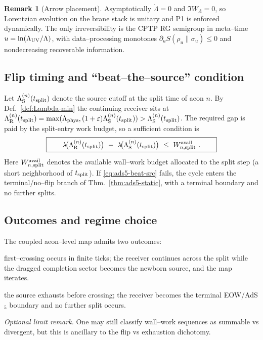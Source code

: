 \documentclass[10pt]{article}
\theoremstyle{definition}
\newtheorem{remark}{Remark}[section]
\theoremstyle{plain}
\begin{document}
\begin{remark}[Arrow placement]
\label{rem:ads5-arrow}
Asymptotically $\dot\Lambda=0$ and $\Im W_\Lambda=0$, so Lorentzian evolution on the brane stack is unitary and P1 is enforced dynamically. The only irreversibility is the CPTP RG semigroup in meta--time $u=\ln(\Lambda_{\rm UV}/\Lambda)$, with data--processing monotones $\partial_u S(\rho_u\|\sigma_u)\le 0$ and nondecreasing recoverable information.
\end{remark}

\subsection{Flip timing and ``beat--the--source'' condition}
\label{subsec:ads5-beat-src}

Let $\Lambda^{(n)}_{\rm S}(t_{\rm split})$ denote the source cutoff at the split time of aeon $n$.
By Def.~\ref{def:Lambda-min} the continuing receiver sits at
$\Lambda^{(n)}_{\rm R}(t_{\rm split})=\max(\Lambda_{\rm phys},(1+\varepsilon)\Lambda^{(n)}_{\rm S}(t_{\rm split}))>\Lambda^{(n)}_{\rm S}(t_{\rm split})$.
The required gap is paid by the split-entry work budget, so a sufficient condition is
\begin{equation}
\boxed{\qquad
\lambda\!\big(\Lambda^{(n)}_{\rm R}(t_{\rm split})\big)\ -\ \lambda\!\big(\Lambda^{(n)}_{\rm S}(t_{\rm split})\big)
\ \le\ W^{\rm avail}_{n,{\rm split}}\ .
\qquad}
\label{eq:ads5-beat-src}
\end{equation}
Here $W^{\rm avail}_{n,{\rm split}}$ denotes the available wall--work budget allocated to the
split step (a short neighborhood of $t_{\rm split}$).
If \eqref{eq:ads5-beat-src} fails, the cycle enters the terminal/no--flip branch of
Thm.~\ref{thm:ads5-static}, with a terminal boundary and no further splits.

\subsection{Outcomes and regime choice}
\label{subsec:ads5-two-regimes}

The coupled aeon--level map admits two outcomes:
\begin{description}[leftmargin=1.25em,itemsep=2pt,topsep=2pt]
\item[Flip branch:] first--crossing occurs in finite ticks; the receiver continues across the split while the dragged completion sector becomes the newborn source, and the map iterates.
\item[Exhaustion branch:] the source exhausts before crossing; the receiver becomes the terminal EOW/AdS$_5$ boundary and no further split occurs.
\end{description}
\noindent\emph{Optional limit remark.} One may still classify wall--work sequences as summable vs divergent,
but this is ancillary to the flip vs exhaustion dichotomy.
\end{document}
